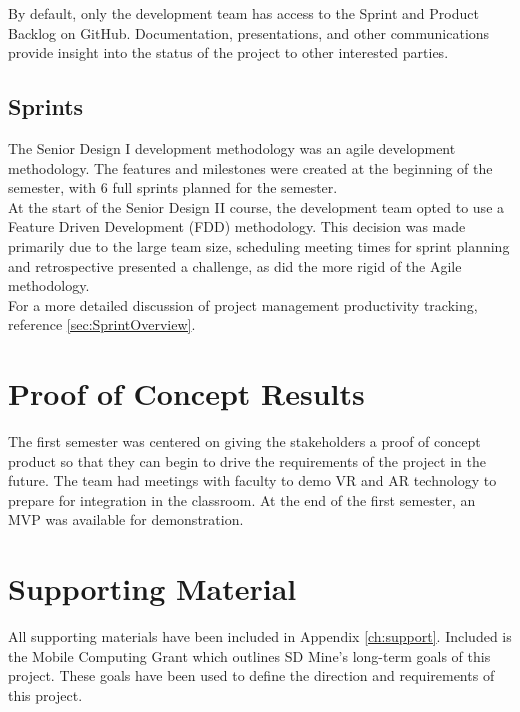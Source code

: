 By default, only the development team has access to the Sprint and Product 
Backlog on GitHub.  Documentation, presentations, and 
other communications provide insight into the status of the project to other interested parties. 

\subsection{Sprints}
The Senior Design I development methodology was an agile development methodology.
The features and milestones were created at the beginning of the semester, with 6 full sprints planned for the semester.\\

At the start of the Senior Design II course, the development team opted to use a Feature Driven Development (FDD) methodology.  
This decision was made primarily due to the large team size, scheduling meeting times for sprint planning and retrospective presented a challenge, as did the more rigid of the Agile methodology.\\

For a more detailed discussion of project management productivity tracking, reference \ref{sec:SprintOverview}.

\section{Proof of Concept Results}


The first semester was centered on giving the 
stakeholders a proof of concept product so that they can begin to drive the requirements
of the project in the future. The team had meetings with faculty to demo 
 VR and AR technology to prepare for integration in the classroom. At the end of the first semester, an MVP was available for demonstration. 

\section{Supporting Material}

All supporting materials have been included in Appendix \ref{ch:support}. Included is the Mobile Computing Grant which outlines SD Mine's long-term goals of this project. These goals have been used to define the direction and requirements of this project.
